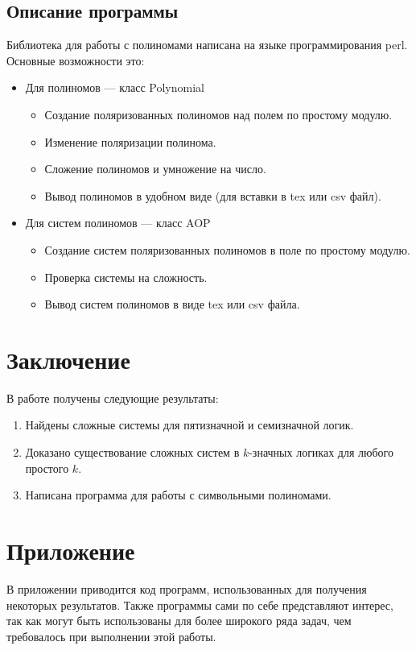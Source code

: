 \documentclass[bibliography=totoc, a4paper, 12pt]{extarticle}
\let\stdsection\section
\renewcommand\section{\newpage\stdsection}
\begin{document}
\subsection{Описание программы}

Библиотека для работы с полиномами написана на языке программирования perl.
Основные возможности это:
\begin{itemize}
  \item Для полиномов — класс Polynomial
  \begin{itemize}
    \item Создание поляризованных полиномов над полем по простому модулю.
    \item Изменение поляризации полинома.
    \item Сложение полиномов и умножение на число.
    \item Вывод полиномов в удобном виде (для вставки в tex или csv файл).
  \end{itemize}
  \item Для систем полиномов — класс AOP
  \begin{itemize}
    \item Создание систем поляризованных полиномов в поле по простому модулю.
    \item Проверка системы на сложность.
    \item Вывод систем полиномов в виде tex или csv файла.
  \end{itemize}
\end{itemize}

\section{Заключение}
В работе получены следующие результаты:
\begin{enumerate}
\item Найдены сложные системы для пятизначной и семизначной логик.

\item Доказано существование сложных систем в $k$-значных логиках для любого
простого $k$.

\item Написана программа для работы с символьными полиномами.
\end{enumerate}


\section{Приложение}

В приложении приводится код программ, использованных для получения некоторых
результатов. Также программы сами по себе представляют интерес, так как могут
быть использованы для более широкого ряда задач, чем требовалось при
выполнении этой работы.
\end{document}
